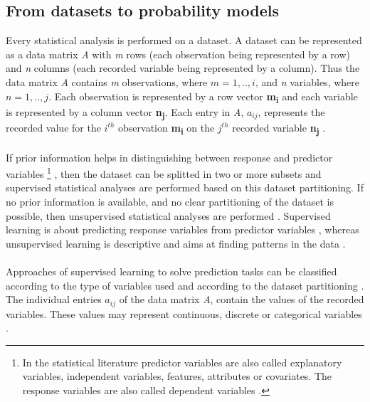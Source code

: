\documentclass {article}
\begin{document}
\subsection{From datasets to probability models}

Every statistical analysis is performed on a dataset. 
A dataset can be represented as a data matrix \textit{A} with \textit{m} rows (each observation being represented by a row) and \textit{n} columns (each recorded variable being represented by a column). 
Thus the data matrix \textit{A} contains \textit{m} observations, where $m=1,..,i$, and \textit{n} variables, where $n=1,..,j$.
Each observation is represented by a row vector \textbf{m\textsubscript{i}} and each variable is represented by a column vector \textbf{n\textsubscript{j}}.  
 Each entry in \textit{A}, $a_{ij}$, represents the recorded value for the $i^{th}$ observation \textbf{m\textsubscript{i}} on the $j^{th}$ recorded variable \textbf{n\textsubscript{j}} \cite{quinn_experimental_2002} \cite{carroll_mathematical_1997}.
\\
\\ 
 If prior information helps in distinguishing between response and predictor variables 
\footnote{In the statistical literature predictor variables are also called explanatory variables, independent variables, features, attributes or covariates. The response variables are also called dependent variables \cite{hastie_elements_2013} \cite{murphy_machine_2012}.}
, then the dataset can be splitted in two or more subsets and supervised statistical analyses are performed based on this dataset partitioning.
 If no prior information is available, and no clear partitioning of the dataset is possible, then unsupervised statistical analyses are performed \cite{hastie_elements_2013} \cite{carroll_mathematical_1997}.  
Supervised learning is about predicting response variables from predictor variables \cite{hastie_elements_2013}, whereas unsupervised learning is descriptive and aims at finding patterns in the data \cite{murphy_machine_2012}.
\\
\\
Approaches of supervised learning to solve prediction tasks can be classified according to the type of variables used \cite{hastie_elements_2013} and according to the dataset partitioning \cite{carroll_mathematical_1997}.    
The individual entries $a_{ij}$ of the data matrix \textit{A}, contain the values of the recorded variables.
 These values may represent continuous, discrete or categorical variables \cite{carroll_mathematical_1997}.
\end{document}
